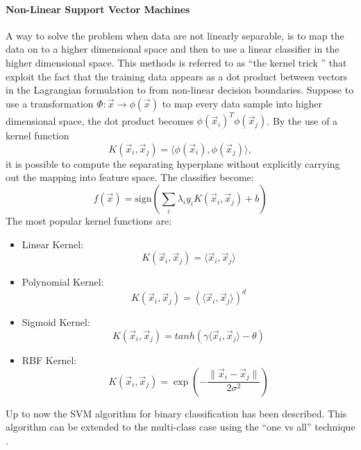 \paragraph{Non-Linear Support Vector Machines}
A way to solve the problem when data are not linearly separable, is to map the data on to a higher dimensional space and then to use a linear classifier in the higher dimensional space. This methods is referred to as ``the kernel trick '' that exploit the fact that the training data appears as a dot product between vectors in the Lagrangian formulation to from non-linear decision boundaries. Suppose to use a transformation $ \Phi:\vec{x} \to \phi(\vec{x}) $ to map every data sample into higher dimensional space, the dot product becomes $\phi(\vec{x}_i)^{T}\phi(\vec{x}_j)$. By the use of a kernel function 
\begin{equation}
K(\vec{x}_i,\vec{x}_j) = \langle\phi(\vec{x}_i), \phi(\vec{x}_j) \rangle ,
\end{equation}
it
is possible to compute the separating hyperplane without explicitly carrying out
the mapping into feature space. The classifier become:
\begin{equation}
f(\vec{x}) = \mbox{sign}(\sum_i \lambda_i y_i K(\vec{x}_i, \vec{x}_j) + b)
\end{equation}
The most popular kernel functions are:
\begin{itemize}
	\item Linear Kernel: 
	\begin{equation}
	K(\vec{x}_i,\vec{x}_j) = \langle\vec{x}_i, \vec{x}_j \rangle 
	\end{equation}
	
	\item Polynomial Kernel:  	  	 
	\begin{equation}
	K(\vec{x}_i,\vec{x}_j) = (\langle\vec{x}_i, \vec{x}_j \rangle)^d 
	\end{equation}
	\item Sigmoid Kernel: 
	\begin{equation}
	K(\vec{x}_i,\vec{x}_j) = tanh(\gamma\langle\vec{x}_i, \vec{x}_j \rangle -\theta ) 
	\end{equation}
	\item RBF Kernel: 
	\begin{equation}
	K(\vec{x}_i,\vec{x}_j) = \exp(-\frac{\|\vec{x}_i - \vec{x}_j \|}{2\sigma^2})  
	\end{equation}
\end{itemize}

Up to now the SVM algorithm for binary classification has been described. This algorithm can be extended to the multi-class case using the ``one vs all'' technique \cite{bishop06}.


